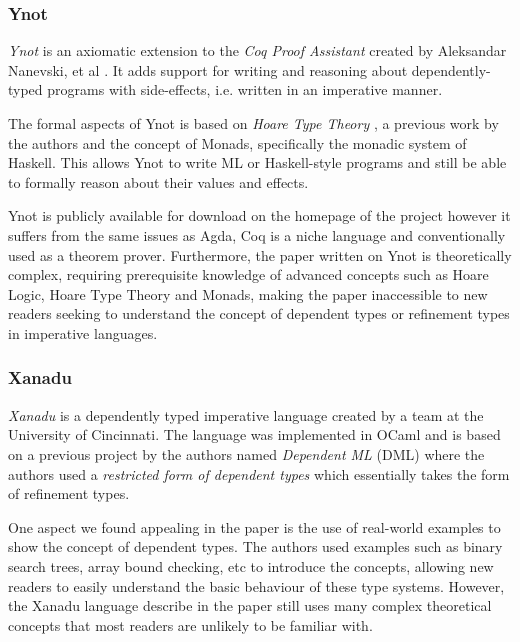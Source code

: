 \documentclass[a4paper,12pt]{report}
\begin{document}
\subsubsection{Ynot}
\textit{Ynot} is an axiomatic extension to the \textit{Coq Proof Assistant} 
\cite{coq} created by Aleksandar Nanevski, et al \cite{ynot}. It adds 
support for writing and reasoning about dependently-typed 
programs with side-effects, i.e. written in an imperative manner. 

\par
The formal aspects of Ynot is based on \textit{Hoare Type Theory} \cite{htt}, 
a previous work by the authors and the concept of Monads, specifically 
the monadic system of Haskell. This allows Ynot to write 
ML or Haskell-style programs and still be able to formally 
reason about their values and effects.

\par
Ynot is publicly available for download on the homepage of the 
project \cite{theYnotProject} however it suffers from the same issues as 
Agda, Coq is a niche language and conventionally used as a theorem prover. 
Furthermore, the paper written on Ynot is theoretically complex, 
requiring prerequisite knowledge of advanced concepts such as Hoare 
Logic, Hoare Type Theory and Monads, making the paper inaccessible 
to new readers seeking to understand the concept of dependent types 
or refinement types in imperative languages. 

\subsubsection{Xanadu}
\textit{Xanadu} \cite{xanadu} is a dependently typed imperative language 
created by a team at the University of Cincinnati. The language was implemented 
in OCaml and is based on a previous project by the 
authors named \textit{Dependent ML} (DML) where the authors used a 
\textit{restricted form of dependent types} which essentially takes the 
form of refinement types.

\par
One aspect we found appealing in the paper is the use of real-world examples to 
show the concept of dependent types. The authors used examples such as binary 
search trees, array bound checking, etc to introduce the concepts, allowing new 
readers to easily understand the basic behaviour of these 
type systems. However, the Xanadu language describe in the paper still uses many 
complex theoretical concepts that most readers are unlikely to be familiar with. 
\end{document}
